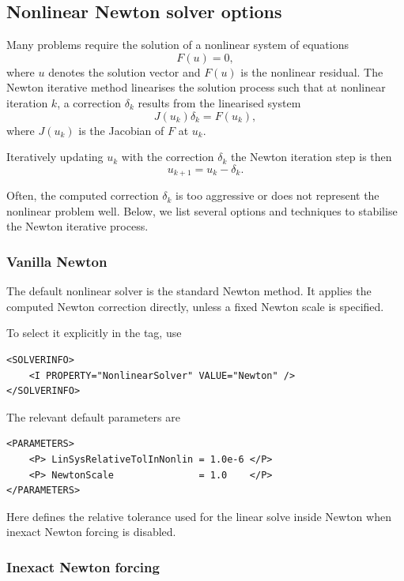 \subsection{Nonlinear Newton solver options}

Many problems require the solution of a nonlinear system of equations
$$
    F(u) = 0,
$$
where $u$ denotes the solution vector and $F(u)$ is the nonlinear
residual. The Newton iterative method linearises the solution process such that
at nonlinear iteration $k$,
a correction $\delta_k$ results from the linearised system
$$
    J(u_k)\delta_k = F(u_k),
$$
where $J(u_k)$ is the Jacobian of $F$ at $u_k$.

Iteratively updating $u_k$ with the correction $\delta_k$ the Newton iteration step is then
$$
    u_{k+1} = u_k - \delta_k.
$$

Often, the computed correction $\delta_k$ is too aggressive or does not represent
the nonlinear problem well.
Below, we list several options and techniques to stabilise the Newton iterative process.

\subsubsection{Vanilla Newton}

The default nonlinear solver is the standard Newton method. It applies the
computed Newton correction directly, unless a fixed Newton scale is specified.

To select it explicitly in the  tag, use
\begin{lstlisting}[style=XMLStyle]
<SOLVERINFO>
    <I PROPERTY="NonlinearSolver" VALUE="Newton" />
</SOLVERINFO>
\end{lstlisting}

The relevant default parameters are
\begin{lstlisting}[style=XMLStyle]
<PARAMETERS>
    <P> LinSysRelativeTolInNonlin = 1.0e-6 </P>
    <P> NewtonScale               = 1.0    </P>
</PARAMETERS>
\end{lstlisting}

Here  defines the relative tolerance used for
the linear solve inside Newton when inexact Newton forcing is disabled.

\subsubsection{Inexact Newton forcing}

